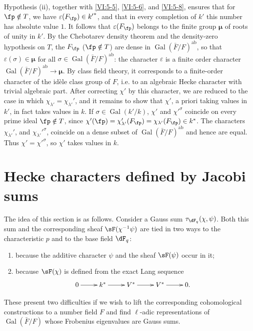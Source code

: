 \documentclass[oneside]{book}
\DeclareMathOperator{\gal}{Gal}
\newcommand{\dmu}{{\bm\mu}}
\newcounter{char}
\theoremstyle{sga-source}
\theoremstyle{sga-source-dash}
\theoremstyle{sga-source-dotdash}
\theoremstyle{sga-source-number-note-dash}
\theoremstyle{sga-source-note-number-dotdash}
\theoremstyle{sga-source-example-dotdash}
\theoremstyle{sga-source-inline-number}
\theoremstyle{sga-source-bare-number}
\theoremstyle{sga-source}
\newcommand{\PrintPage}[1]{}\newcommand{\MathPage}[1]{}\newcommand{\PrintCite}[2]{#1}\newcommand{\var}[3]{#2}
\begin{document}
Hypothesis (ii), together with \ref{VI:5-5}, \ref{VI:5-6}, and \ref{VI:5-8}, ensures that 
for $\fp\notin T$, we have $\varepsilon(F_\fp)\in {k'}^\ast$, and that in every 
completion of $k'$ this number has absolute value $1$. It follows that 
$\varepsilon(F_\fp)$ belongs to the finite group $\dmu$ of roots of unity 
in $k'$. By the Chebotarev density theorem and the density-zero hypothesis 
on $T$, the $F_\fp$ ($\fp\notin T$) are dense in 
  $\gal(\bar F/F)^\text{ab}$, so that $\varepsilon(\sigma)\in \dmu$ for all 
$\sigma\in \gal(\bar F/F)^\text{ab}$: the character $\varepsilon$ is a 
  finite order character $\gal(\bar F/F)^\text{ab}\to \dmu$. By 
class field theory, it corresponds to a finite-order character 
of the idèle class group of $F$, i.e. to an algebraic Hecke character 
with trivial algebraic part. After correcting $\chi'$ by this 
character, we are reduced to the case in which 
$\chi_{\lambda'}=\chi_{\lambda'}'$, and it remains to show that $\chi'$, 
a priori taking values in $k'$, in fact takes values in $k$. If 
$\sigma\in \gal(k'/k)$, $\chi'$ and ${\chi'}^\sigma$ coincide on every prime 
ideal $\fp\notin T$, since 
$\chi'(\fp) = \chi'_{\lambda'}(F_\fp) = \chi_{\lambda'}(F_\fp) \in k^\ast$. 
The characters $\chi_{\lambda'}'$, and ${\chi_{\lambda'}'}^\sigma$, coincide 
on a dense subset of $\gal(\bar F/F)^\text{ab}$ and hence are equal. Thus 
$\chi'={\chi'}^\sigma$, so $\chi'$ takes values in $k$. 










\PrintPage{213}
\section{Hecke characters defined by Jacobi sums}\label{VI:6}

The idea of this section is as follows. Consider a Gauss sum 
$\tau_{\dF_q}(\chi,\psi)$. Both this sum and the corresponding sheaf 
$\sF(\chi^{-1}\psi)$ are tied in two ways to the characteristic $p$ and to the 
base field $\dF_q$: 
\begin{enumerate}[\indent a)]
  \item because the additive character $\psi$ and the sheaf 
    $\sF(\psi)$ occur in it; 
  \item because $\sF(\chi)$ is defined from the exact Lang sequence 
    \[\xymatrix{
      0 \ar[r] 
        & k^\ast \ar[r] 
        & V^\ast \ar[r] 
        & V^\ast \ar[r] 
        & 0 \text{.} 
    }\]
\end{enumerate}
These present two difficulties if we wish to lift the corresponding 
cohomological constructions to a number field $F$ and find 
$\ell$-adic representations of $\gal(\bar F/F)$ whose Frobenius eigenvalues 
are Gauss sums. 
\end{document}

